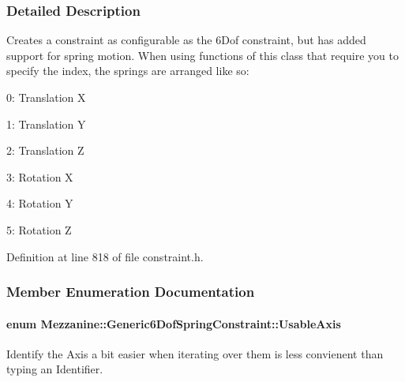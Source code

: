 \subsubsection{Detailed Description}
Creates a constraint as configurable as the 6Dof constraint, but has added support for spring motion. When using functions of this class that require you to specify the index, the springs are arranged like so: \par

\begin{DoxyItemize}
\item 0: Translation X
\item 1: Translation Y
\item 2: Translation Z
\item 3: Rotation X
\item 4: Rotation Y
\item 5: Rotation Z 
\end{DoxyItemize}

Definition at line 818 of file constraint.h.



\subsubsection{Member Enumeration Documentation}
\hypertarget{classMezzanine_1_1Generic6DofSpringConstraint_acdffbc070d80b5480bf1020d4a2351ed}{
\paragraph[{UsableAxis}]{\setlength{\rightskip}{0pt plus 5cm}enum {\bf Mezzanine::Generic6DofSpringConstraint::UsableAxis}}\hfill}
\label{classMezzanine_1_1Generic6DofSpringConstraint_acdffbc070d80b5480bf1020d4a2351ed}


Identify the Axis a bit easier when iterating over them is less convienent than typing an Identifier. 

